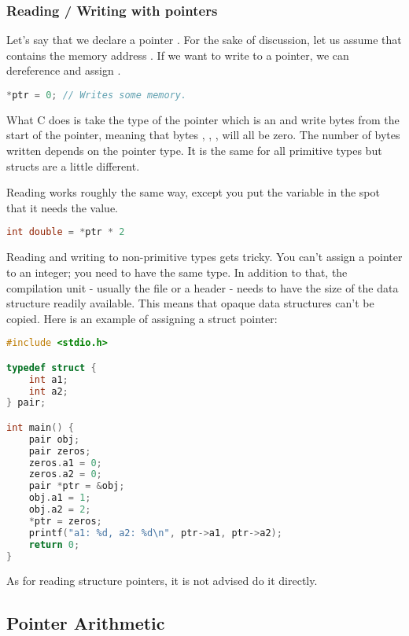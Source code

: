 \subsubsection{Reading / Writing with pointers}

Let's say that we declare a pointer . For the sake of discussion, let us assume that  contains the memory address .
If we want to write to a pointer, we can dereference and assign .

\begin{lstlisting}[language=C]
*ptr = 0; // Writes some memory.
\end{lstlisting}

What C does is take the type of the pointer which is an  and write  bytes from the start of the pointer, meaning that bytes , , ,  will all be zero.
The number of bytes written depends on the pointer type.
It is the same for all primitive types but structs are a little different.

Reading works roughly the same way, except you put the variable in the spot that it needs the value.

\begin{lstlisting}[language=C]
  int double = *ptr * 2
\end{lstlisting}

Reading and writing to non-primitive types gets tricky.
You can't assign a pointer to an integer; you need to have the same type.
In addition to that, the compilation unit - usually the file or a header - needs to have the size of the data structure readily available. This means that opaque data structures can't be copied.
Here is an example of assigning a struct pointer:

\begin{lstlisting}[language=C]
#include <stdio.h>

typedef struct {
    int a1;
    int a2;
} pair;

int main() {
    pair obj;
    pair zeros;
    zeros.a1 = 0;
    zeros.a2 = 0;
    pair *ptr = &obj;
    obj.a1 = 1;
    obj.a2 = 2;
    *ptr = zeros;
    printf("a1: %d, a2: %d\n", ptr->a1, ptr->a2);
    return 0;
}
\end{lstlisting}

As for reading structure pointers, it is not advised do it directly.

\subsection{Pointer Arithmetic}

